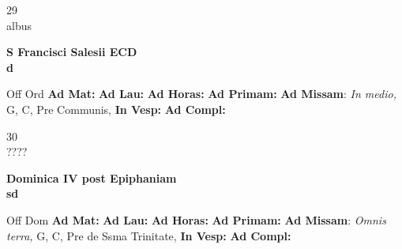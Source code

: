 \documentclass[10pt, openany]{book}
\begin{document}
    \begin{center}
        \begin{minipage}{3.5in}
            \vspace{2em}
            \begin{minipage}{0.5in}
                {\Huge 29} \\
                {\normalsize albus}
            \end{minipage}
            \begin{minipage}{3.0in}
                \textbf{ \large S Francisci Salesii ECD \\
                \textnormal{\normalsize d}}

            \end{minipage}
            \begin{justify}Off Ord
                \textbf{Ad Mat: }
                \textbf{Ad Lau: }
                \textbf{Ad Horas: }
                \textbf{Ad Primam: }\textbf{Ad Missam}: \textit{In medio,} G, C, Pre Communis, 
                \textbf{In Vesp: }
                \textbf{Ad Compl: }
            \end{justify}
        \end{minipage}
    \end{center}

    \begin{center}
        \begin{minipage}{3.5in}
            \vspace{2em}
            \begin{minipage}{0.5in}
                {\Huge 30} \\
                {\normalsize ????}
            \end{minipage}
            \begin{minipage}{3.0in}
                \textbf{ \large Dominica IV post Epiphaniam \\
                \textnormal{\normalsize sd}}

            \end{minipage}
            \begin{justify}Off Dom
                \textbf{Ad Mat: }
                \textbf{Ad Lau: }
                \textbf{Ad Horas: }
                \textbf{Ad Primam: }\textbf{Ad Missam}: \textit{Omnis terra,} G, C, Pre de Ssma Trinitate, 
                \textbf{In Vesp: }
                \textbf{Ad Compl: }
            \end{justify}
        \end{minipage}
    \end{center}
\end{document}
